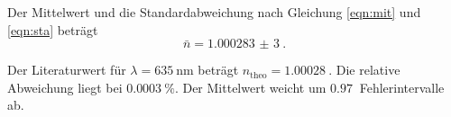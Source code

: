 Der Mittelwert und die Standardabweichung nach Gleichung \eqref{eqn:mit} und \eqref{eqn:sta} beträgt
\begin{equation*}
  \bar{n} = \SI{1,000283(3)}{}.
\end{equation*}

Der Literaturwert \cite{sample2} für $\lambda = \SI{635}{\nm}$ beträgt $n_\text{theo} = \SI{1,00028}{}$. Die relative Abweichung liegt
bei $\SI{0,0003}{\%}$. Der Mittelwert weicht um $\SI{0,97}{}$ Fehlerintervalle ab.
